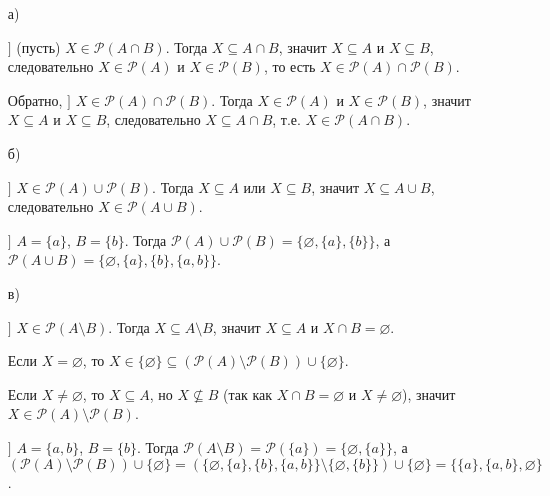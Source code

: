 \documentclass{article}
\begin{document}
\begin{solution}[1.2]
\begin{enumerate}
    \item[а)] 
    
    $\rbrack$ (пусть) $X \in \mathcal{P}(A \cap B)$. Тогда $X \subseteq A \cap B$, значит $X \subseteq A$ и $X \subseteq B$, следовательно $X \in \mathcal{P}(A)$ и $X \in \mathcal{P}(B)$, то есть $X \in \mathcal{P}(A) \cap \mathcal{P}(B)$.
    
    Обратно, $\rbrack$ $X \in \mathcal{P}(A) \cap \mathcal{P}(B)$. Тогда $X \in \mathcal{P}(A)$ и $X \in \mathcal{P}(B)$, значит $X \subseteq A$ и $X \subseteq B$, следовательно $X \subseteq A \cap B$, т.е. $X \in \mathcal{P}(A \cap B)$.
    
    \item[б)] 
    
    $\rbrack$ $X \in \mathcal{P}(A) \cup \mathcal{P}(B)$. Тогда $X \subseteq A$ или $X \subseteq B$, значит $X \subseteq A \cup B$, следовательно $X \in \mathcal{P}(A \cup B)$.
    
     $\rbrack$ $A = \{a\}$, $B = \{b\}$. Тогда $\mathcal{P}(A) \cup \mathcal{P}(B) = \{\varnothing, \{a\}, \{b\}\}$, а $\mathcal{P}(A \cup B) = \{\varnothing, \{a\}, \{b\}, \{a,b\}\}$.
    
    \item[в)] 
    
    $\rbrack$ $X \in \mathcal{P}(A \setminus B)$. Тогда $X \subseteq A \setminus B$, значит $X \subseteq A$ и $X \cap B = \varnothing$. 
    
    Если $X = \varnothing$, то $X \in \{\varnothing\} \subseteq (\mathcal{P}(A) \setminus \mathcal{P}(B)) \cup \{\varnothing\}$.
    
    Если $X \neq \varnothing$, то $X \subseteq A$, но $X \not\subseteq B$ (так как $X \cap B = \varnothing$ и $X \neq \varnothing$), значит $X \in \mathcal{P}(A) \setminus \mathcal{P}(B)$.
    
     $\rbrack$ $A = \{a,b\}$, $B = \{b\}$. Тогда $\mathcal{P}(A \setminus B) = \mathcal{P}(\{a\}) = \{\varnothing, \{a\}\}$, а $(\mathcal{P}(A) \setminus \mathcal{P}(B)) \cup \{\varnothing\} = (\{\varnothing, \{a\}, \{b\},\{a,b\}\} \setminus \{\varnothing, \{b\}\}) \cup \{\varnothing\} = \{\{a\}, \{a,b\}, \varnothing\}$.
\end{enumerate}
\end{solution}
\end{document}
